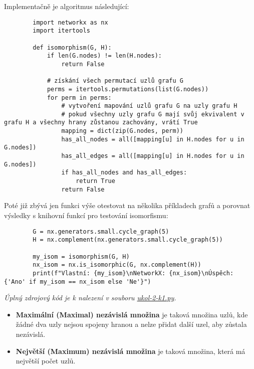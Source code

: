 \documentclass[10pt, a4paper]{ReportSheet}
\begin{document}
    Implementačně je algoritmus následující:
    \begin{verbatim}
        import networkx as nx
        import itertools

        def isomorphism(G, H):
            if len(G.nodes) != len(H.nodes):
                return False

            # získání všech permutací uzlů grafu G
            perms = itertools.permutations(list(G.nodes))
            for perm in perms:
                # vytvoření mapování uzlů grafu G na uzly grafu H
                # pokud všechny uzly grafu G mají svůj ekvivalent v grafu H a všechny hrany zůstanou zachovány, vrátí True
                mapping = dict(zip(G.nodes, perm))
                has_all_nodes = all([mapping[u] in H.nodes for u in G.nodes])
                has_all_edges = all([mapping[u] in H.nodes for u in G.nodes])
                if has_all_nodes and has_all_edges:
                    return True
                return False
    \end{verbatim}

    Poté již zbývá jen funkci výše otestovat na několika příkladech grafů a porovnat výsledky s knihovní funkcí pro
    testování isomorfismu:
    \begin{verbatim}
        G = nx.generators.small.cycle_graph(5)
        H = nx.complement(nx.generators.small.cycle_graph(5))

        my_isom = isomorphism(G, H)
        nx_isom = nx.is_isomorphic(G, nx.complement(H))
        print(f"Vlastní: {my_isom}\nNetworkX: {nx_isom}\nÚspěch: {'Ano' if my_isom == nx_isom else 'Ne'}")
    \end{verbatim}

    \textit{
        Úplný zdrojový kód je k nalezení v souboru \href{https://github.com/filipditrich/MMAD-2024/blob/main/ukol-2-k1.py}{ukol-2-k1.py}.
    }
    \newpage

    \begin{itemize}
        \item \textbf{Maximální (Maximal) nezávislá množina} je taková množina uzlů, kde žádné dva uzly nejsou spojeny
        hranou a nelze přidat další uzel, aby zůstala nezávislá.
        \item \textbf{Největší (Maximum) nezávislá množina} je taková množina, která má největší počet uzlů.
    \end{itemize}
\end{document}

